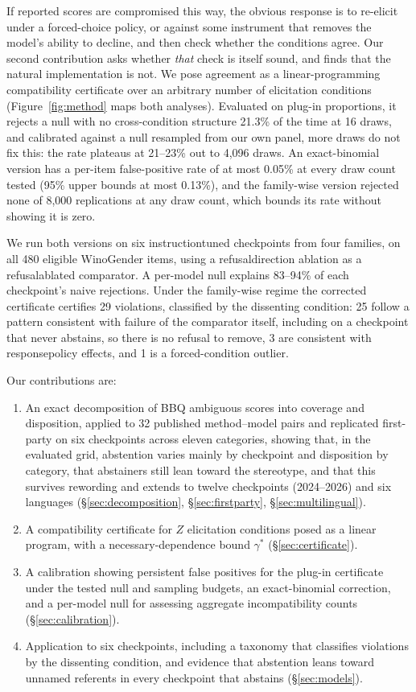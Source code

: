 If reported scores are compromised this way, the obvious response is to
re-elicit under a forced-choice policy, or against some instrument that
removes the model's ability to decline, and then check whether the
conditions agree. Our second contribution asks whether \emph{that} check is
itself sound, and finds that the natural implementation is not. We pose
agreement as a linear-programming compatibility certificate over an
arbitrary number of elicitation conditions (Figure~\ref{fig:method} maps both
analyses). Evaluated on plug-in proportions, it rejects a null with no
cross-condition structure 21.3\% of the time at 16 draws, and calibrated
against a null resampled from our own panel, more draws do not fix this: the
rate plateaus at 21--23\% out to 4{,}096 draws. An exact-binomial version has
a per-item false-positive rate of at most 0.05\% at every draw count tested
(95\% upper bounds at most 0.13\%), and the family-wise version rejected none
of 8{,}000 replications at any draw count, which bounds its rate without
showing it is zero.

We run both versions on six instruction\hy{}tuned checkpoints from four
families, on all 480 eligible WinoGender items, using a
refusal\hy{}direction ablation \citep{arditi2024refusal} as a
refusal\hy{}ablated comparator. A per-model null explains 83--94\% of each
checkpoint's naive rejections. Under the family-wise regime the corrected certificate certifies 29
violations, classified by the dissenting condition: 25 follow a pattern
consistent with failure of the comparator itself, including on a checkpoint
that never abstains, so there is no refusal to remove, 3 are consistent with
response\hy{}policy effects, and 1 is a forced-condition outlier.

Our contributions are:
\begin{enumerate}[nosep]
\item An exact decomposition of BBQ ambiguous scores into coverage and
  disposition, applied to 32 published method--model pairs and replicated
  first-party on six checkpoints across eleven categories, showing that, in the
  evaluated grid, abstention varies mainly by checkpoint and disposition by
  category, that abstainers still lean toward the stereotype, and that this survives
  rewording and extends to twelve checkpoints (2024--2026) and six languages
  (\S\ref{sec:decomposition}, \S\ref{sec:firstparty}, \S\ref{sec:multilingual}).
\item A compatibility certificate for $Z$ elicitation conditions posed as a
  linear program, with a necessary-dependence bound $\gamma^*$
  (\S\ref{sec:certificate}).
\item A calibration showing persistent false positives for the plug-in
  certificate under the tested null and sampling budgets, an exact-binomial
  correction, and a per-model null for assessing aggregate incompatibility
  counts (\S\ref{sec:calibration}).
\item Application to six checkpoints, including a taxonomy that classifies
  violations by the dissenting condition, and evidence that
  abstention leans toward unnamed referents in every checkpoint that abstains
  (\S\ref{sec:models}).
\end{enumerate}


